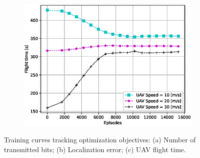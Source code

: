 \documentclass[journal,twocolumn]{IEEEtran}
\begin{document}
{\begin{figure}
\begin{subfigure}[b]{0.33\textwidth}
                \centering
                \includegraphics[width=1\linewidth]{Figures/my_figure_4.eps}
                \caption{}
                \label{fig.1c}
        \end{subfigure}
        \caption{Training curves tracking optimization objectives: (a) Number of transmitted bits; (b) Localization error; (c) UAV flight time.}\label{fig_FL}
\end{figure}


}
\end{document}
